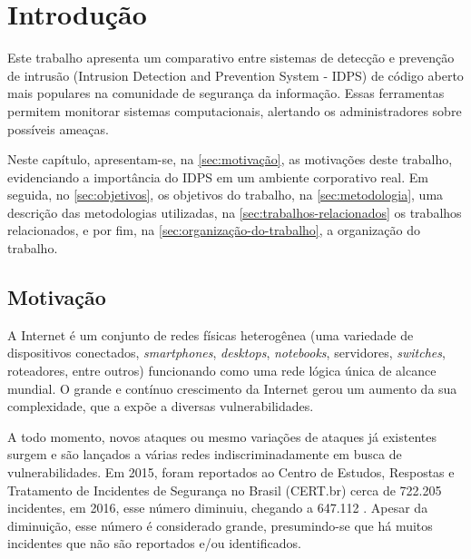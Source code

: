 \chapter{Introdução} \label{ch:introdução}
Este trabalho apresenta um comparativo entre sistemas de detecção e prevenção de intrusão (Intrusion Detection and Prevention System - IDPS) de código aberto mais populares na comunidade de segurança da informação. Essas ferramentas permitem monitorar sistemas computacionais, alertando os administradores sobre possíveis ameaças.

Neste capítulo, apresentam-se, na \autoref{sec:motivação}, as motivações deste trabalho, evidenciando a importância do IDPS em um ambiente corporativo real. Em seguida, no \autoref{sec:objetivos}, os objetivos do trabalho, na \autoref{sec:metodologia}, uma descrição das metodologias utilizadas, na \autoref{sec:trabalhos-relacionados} os trabalhos relacionados, e por fim, na \autoref{sec:organização-do-trabalho}, a organização do trabalho.

\section{Motivação} \label{sec:motivação} 

A Internet é um conjunto de redes físicas heterogênea (uma variedade de dispositivos conectados, \textit{smartphones}, \textit{desktops}, \textit{notebooks}, servidores, \textit{switches}, roteadores, entre outros) funcionando como uma rede lógica única de alcance mundial. O grande e contínuo crescimento da Internet gerou um aumento da sua complexidade, que a expõe a diversas vulnerabilidades. 

A todo momento, novos ataques ou mesmo variações de ataques já existentes surgem e são lançados a várias redes indiscriminadamente em busca de vulnerabilidades. Em 2015, foram reportados ao Centro de Estudos, Respostas e Tratamento de Incidentes de Segurança no Brasil (CERT.br) cerca de 722.205 incidentes, em 2016, esse número diminuiu, chegando a 647.112 \cite{estatistica:cert.br}. Apesar da diminuição, esse número é considerado grande, presumindo-se que há muitos incidentes que não são reportados e/ou identificados.

